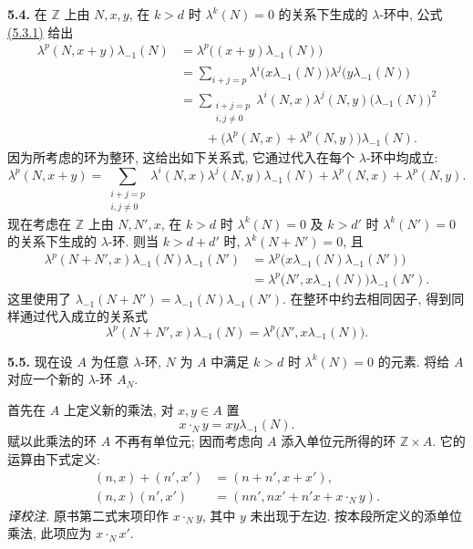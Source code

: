 \textbf{5.4.} 在 \(\mathbb Z\) 上由 \(N,x,y\), 在 \(k>d\) 时 \(\lambda^k(N)=0\) 的关系下生成的 \(\lambda\)-环中, 公式 \hyperlink{sga6.e05.eq.5-3-1}{(5.3.1)} 给出
\begin{align*}
 \lambda^p(N,x+y)\lambda_{-1}(N)
 &=\lambda^p\bigl((x+y)\lambda_{-1}(N)\bigr)\\
 &=\sum_{i+j=p}
   \lambda^i\bigl(x\lambda_{-1}(N)\bigr)
   \lambda^j\bigl(y\lambda_{-1}(N)\bigr)\\
 &=\sum_{\substack{i+j=p\\ i,j\ne0}}
   \lambda^i(N,x)\lambda^j(N,y)\bigl(\lambda_{-1}(N)\bigr)^2\\
 &\qquad{}+\bigl(\lambda^p(N,x)+\lambda^p(N,y)\bigr)\lambda_{-1}(N).
\end{align*}
因为所考虑的环为整环, 这给出如下关系式, 它通过代入在每个 \(\lambda\)-环中均成立:
\begin{equation}\tag{5.4.1}
 \lambda^p(N,x+y)
 =\sum_{\substack{i+j=p\\ i,j\ne0}}
   \lambda^i(N,x)\lambda^j(N,y)\lambda_{-1}(N)
   +\lambda^p(N,x)+\lambda^p(N,y).
\end{equation}
现在考虑在 \(\mathbb Z\) 上由 \(N,N',x\), 在 \(k>d\) 时 \(\lambda^k(N)=0\) 及 \(k>d'\) 时 \(\lambda^k(N')=0\) 的关系下生成的 \(\lambda\)-环. 则当 \(k>d+d'\) 时, \(\lambda^k(N+N')=0\), 且
\begin{align*}
 \lambda^p(N+N',x)\lambda_{-1}(N)\lambda_{-1}(N')
 &=\lambda^p\bigl(x\lambda_{-1}(N)\lambda_{-1}(N')\bigr)\\
 &=\lambda^p\bigl(N',x\lambda_{-1}(N)\bigr)\lambda_{-1}(N').
\end{align*}
这里使用了 \(\lambda_{-1}(N+N')=\lambda_{-1}(N)\lambda_{-1}(N')\). 在整环中约去相同因子, 得到同样通过代入成立的关系式
\begin{equation}\tag{5.4.2}
  \lambda^p(N+N',x)\lambda_{-1}(N)
  =\lambda^p\bigl(N',x\lambda_{-1}(N)\bigr).
\end{equation}

\textbf{5.5.} 现在设 \(A\) 为任意 \(\lambda\)-环, \(N\) 为 \(A\) 中满足 \(k>d\) 时 \(\lambda^k(N)=0\) 的元素. 将给 \(A\) 对应一个新的 \(\lambda\)-环 \(A_N\).

首先在 \(A\) 上定义新的乘法, 对 \(x,y\in A\) 置
\begin{equation}\tag{5.5.1}
 x\cdot_N y=xy\lambda_{-1}(N).
\end{equation}
赋以此乘法的环 \(A\) 不再有单位元; 因而考虑向 \(A\) 添入单位元所得的环 \(\mathbb Z\times A\). 它的运算由下式定义:
\begin{equation}\tag{5.5.2}
 \begin{aligned}
 (n,x)+(n',x')&=(n+n',x+x'),\\
 (n,x)(n',x')&=(nn',nx'+n'x+x\cdot_N y).
 \end{aligned}
\end{equation}
\emph{译校注.} 原书第二式末项印作 \(x\cdot_N y\), 其中 \(y\) 未出现于左边. 按本段所定义的添单位乘法, 此项应为 \(x\cdot_N x'\).

